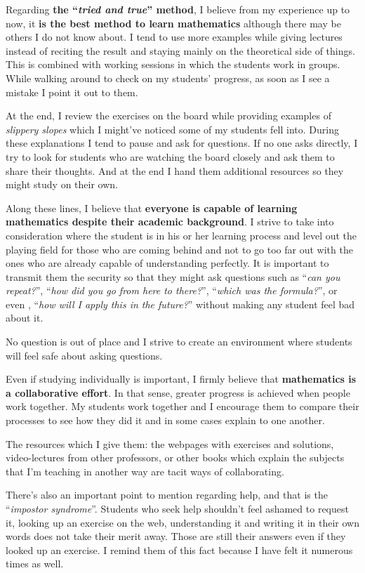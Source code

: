 \documentclass[a4paper,12pt,final]{book}
\begin{document}
Regarding \textbf{the ``\emph{tried and true}'' method}, I believe from my experience up to now, it \textbf{is the best method to learn mathematics} although there may be others I do not know about. I tend to use more examples while giving lectures instead of reciting the result and staying mainly on the theoretical side of things. This is combined with working sessions in which the students work in groups. While walking around to check on my students' progress, as soon as I see a mistake I point it out to them.\par 
At the end, I review the exercises on the board while providing examples of \emph{slippery slopes} which I might've noticed some of my students fell into. During these explanations I tend to pause and ask for questions. If no one asks directly, I try to look for students who are watching the board closely and ask them to share their thoughts. And at the end I hand them additional resources so they might study on their own.\par 
Along these lines, I believe that \textbf{everyone is capable of learning mathematics despite their academic background}.  I strive to take into consideration where the student is in his or her learning process and level out the playing field for those who are coming behind and not to go too far out with the ones who are already capable of understanding perfectly.  It is important to transmit them the security so that they might ask questions such as ``\emph{can you repeat?}'', ``\emph{how did you go from here to there?}'', ``\emph{which was the formula?}'', or even , ``\emph{how will I apply this in the future?}'' without making any student feel bad about it.\par 
No question is out of place and I strive to create an environment where students will feel safe about asking questions.\par 
Even if studying individually is important, I firmly believe that \textbf{mathematics is a collaborative effort}. In that sense, greater progress is achieved when people work together. My students work together and I encourage them to compare their processes to see how they did it and in some cases explain to one another.\par 
The resources which I give them: the webpages with exercises and solutions, video-lectures from other professors, or other books which explain the subjects that I'm teaching in another way are tacit ways of collaborating.\par 
There's also an important point to mention regarding help, and that is the ``\emph{impostor syndrome}''. Students who seek help shouldn't feel ashamed to request it, looking up an exercise on the web, understanding it and writing it in their own words does not take their merit away. Those are still their answers even if they looked up an exercise. I remind them of this fact because I have felt it numerous times as well.\par 
\end{document}
